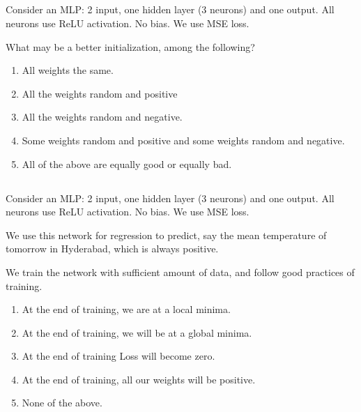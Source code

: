 \begin{frame}
\section{}
Consider an MLP: 2 input, one hidden  layer (3 neurons) and one output. All neurons use ReLU activation. No bias. We use MSE loss.

What may be a better initialization, among the following?

\begin{enumerate}[label=(\Alph*)]
\item All weights the same.
\item All the weights random and positive   %
\item All the weights random and negative.    %
\item Some weights random and positive and some weights random and negative.    %
\item All of the above are equally good or equally bad.  %
\end{enumerate}
\end{frame}


\begin{frame}
\section{}
Consider an MLP: 2 input, one hidden  layer (3 neurons) and one output. All neurons use ReLU activation. No bias. We use MSE loss.

We use this network for regression to predict, say the mean temperature of tomorrow in Hyderabad, which is always positive.

We train the network with sufficient amount of data, and follow good practices of training.

\begin{enumerate}[label=(\Alph*)]
\item At the end of training, we are at a local minima.   %
\item At the end of training, we will be at a global minima.
\item At the end of training Loss will become zero.
\item At the end of training, all our weights will be positive.
\item None of the above.  %
\end{enumerate}
\end{frame}

